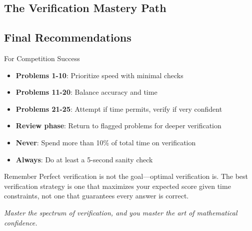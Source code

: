 \documentclass{article}
\begin{document}
\subsection{The Verification Mastery Path}

\begin{center}
\end{center}

\subsection{Final Recommendations}

\begin{successbox}{For Competition Success}
\begin{itemize}
\item \textbf{Problems 1-10}: Prioritize speed with minimal checks
\item \textbf{Problems 11-20}: Balance accuracy and time
\item \textbf{Problems 21-25}: Attempt if time permits, verify if very confident
\item \textbf{Review phase}: Return to flagged problems for deeper verification
\item \textbf{Never}: Spend more than 10\% of total time on verification
\item \textbf{Always}: Do at least a 5-second sanity check
\end{itemize}
\end{successbox}

\begin{contextbox}{Remember}
Perfect verification is not the goal—optimal verification is. The best verification strategy is one that maximizes your expected score given time constraints, not one that guarantees every answer is correct.
\end{contextbox}

\vfill

\begin{center}
\textit{Master the spectrum of verification, and you master the art of mathematical confidence.}
\end{center}
\end{document}
